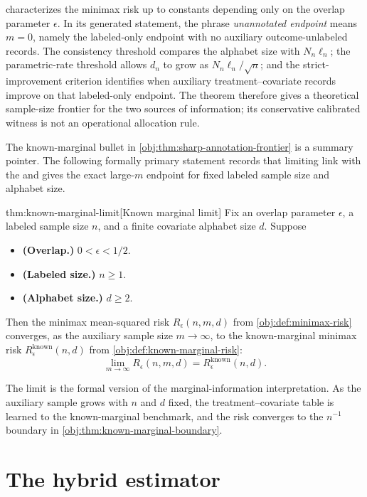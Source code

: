\documentclass[11pt]{article}
\begin{document}
 characterizes the minimax risk up to constants depending only on the overlap parameter \(\epsilon\). In its generated statement, the phrase \emph{unannotated endpoint} means \(m=0\), namely the labeled-only endpoint with no auxiliary outcome-unlabeled records. The consistency threshold compares the alphabet size with \(N_n\ell_n\); the parametric-rate threshold allows \(d_n\) to grow as \(N_n\ell_n/\sqrt n\); and the strict-improvement criterion identifies when auxiliary treatment--covariate records improve on that labeled-only endpoint. The theorem therefore gives a theoretical sample-size frontier for the two sources of information; its conservative calibrated witness is not an operational allocation rule.

The known-marginal bullet in \cref{obj:thm:sharp-annotation-frontier} is a summary pointer. The following formally primary statement records that limiting link with the  and gives the exact large-\(m\) endpoint for fixed labeled sample size and alphabet size.

\begin{theoremv}{thm:known-marginal-limit}[Known marginal limit]
Fix an overlap parameter \(\epsilon\), a labeled sample size \(n\), and a finite covariate alphabet size \(d\). Suppose
\begin{itemize}
\item \textbf{(Overlap.)} \(0<\epsilon<1/2\).
\item \textbf{(Labeled size.)} \(n\ge 1\).
\item \textbf{(Alphabet size.)} \(d\ge 2\).
\end{itemize}
Then the minimax mean-squared risk \(R_\epsilon(n,m,d)\) from \cref{obj:def:minimax-risk} converges, as the auxiliary sample size \(m\to\infty\), to the known-marginal minimax risk \(R_\epsilon^{\mathrm{known}}(n,d)\) from \cref{obj:def:known-marginal-risk}:
\[
\lim_{m\to\infty} R_\epsilon(n,m,d)
=
R_\epsilon^{\mathrm{known}}(n,d).
\]
\end{theoremv}

The limit is the formal version of the marginal-information interpretation. As the auxiliary sample grows with \(n\) and \(d\) fixed, the treatment--covariate table is learned to the known-marginal benchmark, and the risk converges to the \(n^{-1}\) boundary in \cref{obj:thm:known-marginal-boundary}.


\section{The hybrid estimator}\label{sec:hybrid-estimator}
\end{document}
